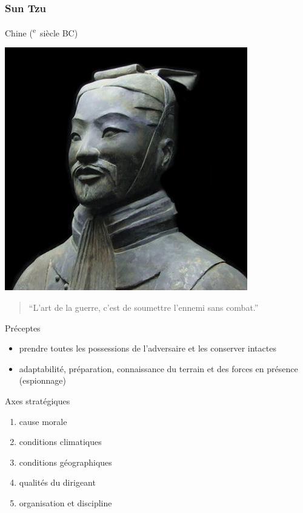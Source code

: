 \documentclass{article}
\newcommand{\cRM}[1]{\MakeUppercase{\romannumeral #1}}  %
\newcommand{\siecle}[1]{\cRM{#1}\textsuperscript{e}~siècle}
\begin{document}
\subsubsection{Sun Tzu}
Chine (\siecle{6} BC) \hfill \begin{minipage}{5cm}
\includegraphics[width=\linewidth]{../ressources/sun_tzu_general}
\end{minipage}
\begin{quote}“L'art de la guerre, c'est de soumettre l'ennemi sans combat.”\end{quote}

Préceptes
\begin{itemize}
\item prendre toutes les possessions de l'adversaire et les conserver intactes
\item adaptabilité, préparation, connaissance du terrain et des forces en présence (espionnage)
\end{itemize}
Axes stratégiques
\begin{enumerate}
\item cause morale
\item conditions climatiques
\item conditions géographiques
\item qualités du dirigeant
\item organisation et discipline
\end{enumerate}
\end{document}
